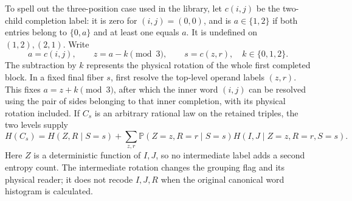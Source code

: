 \documentclass[11pt]{article}
\numberwithin{equation}{section}
\theoremstyle{definition}
\theoremstyle{remark}
\newcommand{\Prob}{\mathbb P}
\begin{document}
To spell out the three-position case used in the library, let \(c(i,j)\)
be the two-child completion label: it is zero for \((i,j)=(0,0)\), and
is \(a\in\{1,2\}\) if both entries belong to \(\{0,a\}\) and at
least one equals \(a\).  It is undefined on \((1,2),(2,1)\).  Write
\[
 a=c(i,j),\qquad z=a-k\pmod3,\qquad s=c(z,r),
 \quad k\in\{0,1,2\}.
\]
The subtraction by \(k\) represents the physical rotation of the whole
first completed block.  In a fixed final fiber \(s\), first resolve the
top-level operand labels \((z,r)\).  This fixes \(a=z+k\pmod3\),
after which the inner word \((i,j)\) can be resolved using the pair of
sides belonging to that inner completion, with its physical rotation
included.  If \(C_s\) is an arbitrary rational law on the retained
triples, the two levels supply
\begin{equation}
 H(C_s)=H(Z,R\mid S=s)
       +\sum_{z,r}\Prob(Z=z,R=r\mid S=s)
                      H(I,J\mid Z=z,R=r,S=s).
 \label{alg:nested-completion-entropy}
\end{equation}
Here \(Z\) is a deterministic function of \(I,J\), so no intermediate
label adds a second entropy count.  The intermediate rotation changes
the grouping flag and its physical reader; it does not recode \(I,J,R\)
when the original canonical word histogram is calculated.
\end{document}
